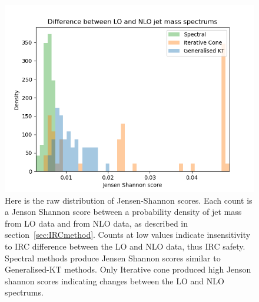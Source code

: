 \begin{figure}[htp]
    \begin{minipage}[c]{0.6\textwidth}
    \includegraphics[width=1.\textwidth]{graphics/JensenShannon_unnormed.png}
    \end{minipage}\hfill
    \begin{minipage}[c]{0.35\textwidth}
    \caption{Here is the raw distribution of Jensen-Shannon scores.
        Each count is a Jenson Shannon score between a probability density of jet mass from LO data and
        from NLO data, as described in section~\ref{sec:IRCmethod}.
        Counts at low values indicate insensitivity to IRC difference between the LO and NLO data,
        thus IRC safety.
        Spectral methods produce Jensen Shannon scores similar to Generalised-KT
        methods. Only Iterative cone produced high Jenson shannon scores indicating changes
        between the LO and NLO spectrums.
     }\label{fig:unnormedJS}
    \end{minipage}
\end{figure}    
